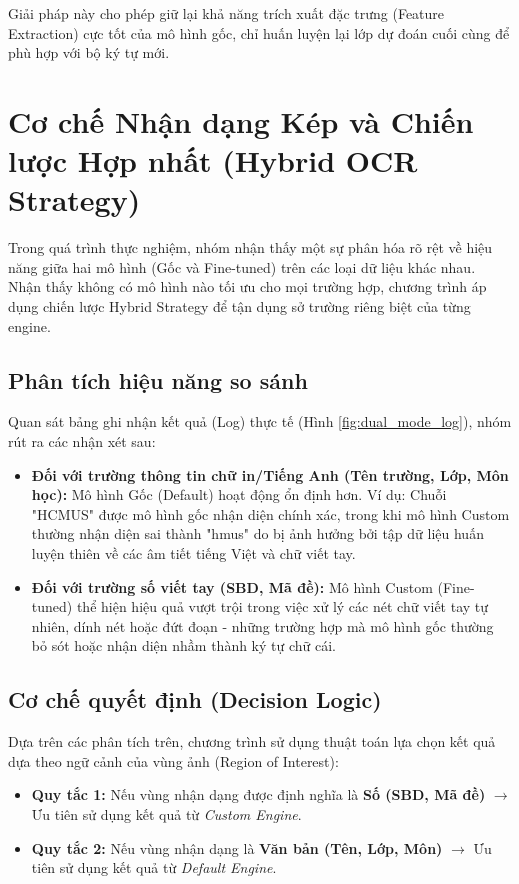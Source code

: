 \documentclass[6pt, a4paper]{report}
\begin{document}
	Giải pháp này cho phép giữ lại khả năng trích xuất đặc trưng (Feature Extraction) cực tốt của mô hình gốc, chỉ huấn luyện lại lớp dự đoán cuối cùng để phù hợp với bộ ký tự mới.

	\section{Cơ chế Nhận dạng Kép và Chiến lược Hợp nhất (Hybrid OCR Strategy)}
	
	Trong quá trình thực nghiệm, nhóm nhận thấy một sự phân hóa rõ rệt về hiệu năng giữa hai mô hình (Gốc và Fine-tuned) trên các loại dữ liệu khác nhau. Nhận thấy không có mô hình nào tối ưu cho mọi trường hợp, chương trình áp dụng chiến lược Hybrid Strategy để tận dụng sở trường riêng biệt của từng engine.
	
	\subsection{Phân tích hiệu năng so sánh}
	Quan sát bảng ghi nhận kết quả (Log) thực tế (Hình \ref{fig:dual_mode_log}), nhóm rút ra các nhận xét sau:
	\begin{itemize}
		\item \textbf{Đối với trường thông tin chữ in/Tiếng Anh (Tên trường, Lớp, Môn học):} Mô hình Gốc (Default) hoạt động ổn định hơn. Ví dụ: Chuỗi "HCMUS" được mô hình gốc nhận diện chính xác, trong khi mô hình Custom thường nhận diện sai thành "hmus" do bị ảnh hưởng bởi tập dữ liệu huấn luyện thiên về các âm tiết tiếng Việt và chữ viết tay.
		\item \textbf{Đối với trường số viết tay (SBD, Mã đề):} Mô hình Custom (Fine-tuned) thể hiện hiệu quả vượt trội trong việc xử lý các nét chữ viết tay tự nhiên, dính nét hoặc đứt đoạn - những trường hợp mà mô hình gốc thường bỏ sót hoặc nhận diện nhầm thành ký tự chữ cái.
	\end{itemize}
	
	\subsection{Cơ chế quyết định (Decision Logic)}
	Dựa trên các phân tích trên, chương trình sử dụng thuật toán lựa chọn kết quả dựa theo ngữ cảnh của vùng ảnh (Region of Interest):
	\begin{itemize}
		\item \textbf{Quy tắc 1:} Nếu vùng nhận dạng được định nghĩa là \textbf{Số (SBD, Mã đề)} $\rightarrow$ Ưu tiên sử dụng kết quả từ \textit{Custom Engine}.
		\item \textbf{Quy tắc 2:} Nếu vùng nhận dạng là \textbf{Văn bản (Tên, Lớp, Môn)} $\rightarrow$ Ưu tiên sử dụng kết quả từ \textit{Default Engine}.
	\end{itemize}
	
\end{document}
